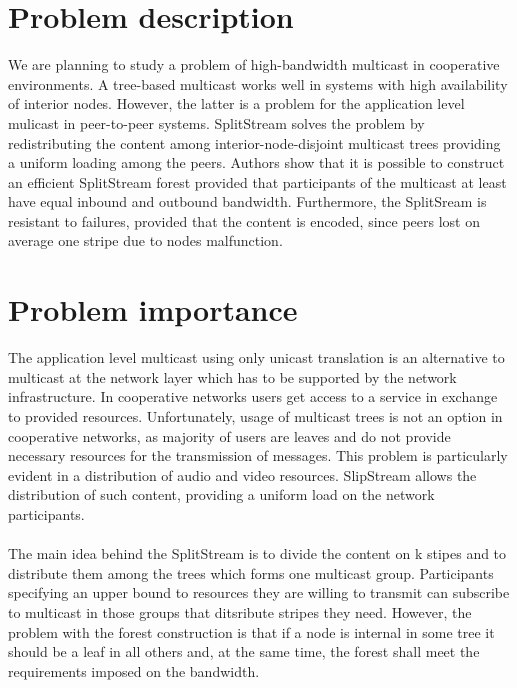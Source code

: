 \documentclass[a4paper,10pt]{article}
\title{}
\author{}
\begin{document}
\maketitle

\section{Problem description}
We are planning to study a problem of high-bandwidth multicast in cooperative environments. 
A tree-based multicast works well in systems with high availability of interior nodes. 
However, the latter is a problem for the application level mulicast in peer-to-peer systems. 
SplitStream \cite{castro1} solves the problem by redistributing the content among interior-node-disjoint
multicast trees providing a uniform loading among the peers. Authors \cite{castro1} show that it is possible
to construct an efficient SplitStream forest provided that participants of the multicast at least have equal
inbound and outbound bandwidth. Furthermore, the SplitSream is resistant to failures, provided that the content
is encoded, since peers lost on average one stripe due to nodes malfunction.
\section{Problem importance}
The application level multicast using only unicast translation is an alternative to multicast at the network layer
which has to be supported by the network infrastructure. In cooperative networks users get access to a service in exchange
to provided resources. Unfortunately, usage of multicast trees is not an option in cooperative networks, as majority of
users are leaves and do not provide necessary resources for the transmission of messages. This problem is particularly
evident in  a distribution of audio and video resources. SlipStream allows the distribution of such content, providing a
uniform load on the network participants.
\paragraph{}
The main idea behind the SplitStream is to divide the content on k stipes and to distribute them among the trees which forms
one multicast group. Participants specifying an upper bound to resources they are willing to transmit can subscribe to
multicast in those groups that ditsribute stripes they need. However, the problem with the forest construction is that if
a node is internal in some tree it should be a leaf in all others and, at the same time, the forest shall meet the
requirements imposed on the bandwidth.
\end{document}
